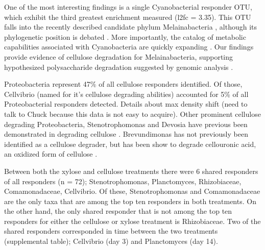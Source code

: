 One of the most interesting findings is a single Cyanobacterial responder OTU, which exhibit the third greatest enrichment measured (l2fc = 3.35). This OTU falls into the recently described candidate phylum Melainabacteria \cite{Di_Rienzi_2013}, although its phylogenetic position is debated \cite{Soo_2014}. More importantly, the catalog of metabolic capabilities associated with Cyanobacteria are quickly expanding \cite{Di_Rienzi_2013, Soo_2014}. Our findings provide evidence of cellulose degradation for Melainabacteria, supporting hypothesized polysaccharide degradation suggested by genomic analysis \cite{Di_Rienzi_2013}.     

Proteobacteria represent 47\% of all cellulose responders identified.  Of those, Cellvibrio (named for it's cellulose degrading abilities) accounted for 5\% of all Proteobacterial responders detected. Details about max density shift (need to talk to Chuck because this data is not easy to acquire). Other prominent cellulose degrading Proteobacteria, Stenotrophomonas and Devosia have previous been demonstrated in degrading cellulose \cite{Trujillo_Cabrera_2012, Verastegui_2014}. Brevundimonas has not previously been identified as a cellulose degrader, but has been show to degrade cellouronic acid, an oxidized form of cellulose \cite{Tavernier_2008}.

Between both the xylose and cellulose treatments there were 6 shared responders of all responders (n = 72); Stenotrophomonas, Planctomyces, Rhizobiaceae, Comamonadaceae, Cellvibrio. Of these, Stenotrophomonas and Comamonadaceae are the only taxa that are among the top ten responders in both treatments. On the other hand, the only shared responder that is not among the top ten responders for either the cellulose or xylose treatment is Rhizobiaceae. Two of the shared responders corresponded in time between the two treatments (supplemental table); Cellvibrio (day 3) and Planctomyces (day 14).  

